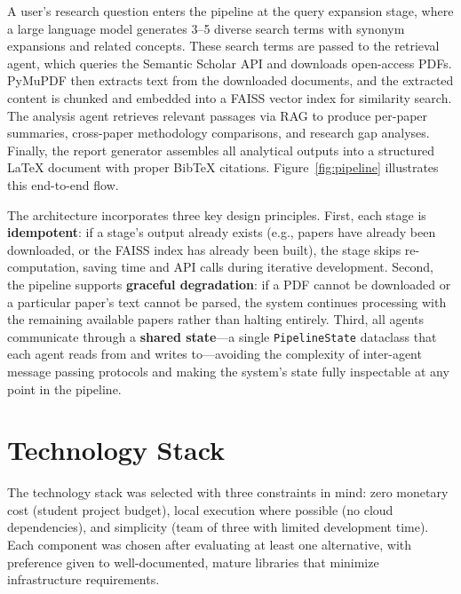 \documentclass[12pt,a4paper]{article}
\begin{document}
A user's research question enters the pipeline at the query expansion stage, where a large language model generates 3--5 diverse search terms with synonym expansions and related concepts. These search terms are passed to the retrieval agent, which queries the Semantic Scholar API and downloads open-access PDFs. PyMuPDF then extracts text from the downloaded documents, and the extracted content is chunked and embedded into a FAISS vector index for similarity search. The analysis agent retrieves relevant passages via RAG to produce per-paper summaries, cross-paper methodology comparisons, and research gap analyses. Finally, the report generator assembles all analytical outputs into a structured LaTeX document with proper BibTeX citations. Figure~\ref{fig:pipeline} illustrates this end-to-end flow.

The architecture incorporates three key design principles. First, each stage is \textbf{idempotent}: if a stage's output already exists (e.g., papers have already been downloaded, or the FAISS index has already been built), the stage skips re-computation, saving time and API calls during iterative development. Second, the pipeline supports \textbf{graceful degradation}: if a PDF cannot be downloaded or a particular paper's text cannot be parsed, the system continues processing with the remaining available papers rather than halting entirely. Third, all agents communicate through a \textbf{shared state}---a single \texttt{PipelineState} dataclass that each agent reads from and writes to---avoiding the complexity of inter-agent message passing protocols and making the system's state fully inspectable at any point in the pipeline.

\section{Technology Stack}

The technology stack was selected with three constraints in mind: zero monetary cost (student project budget), local execution where possible (no cloud dependencies), and simplicity (team of three with limited development time). Each component was chosen after evaluating at least one alternative, with preference given to well-documented, mature libraries that minimize infrastructure requirements.
\end{document}
